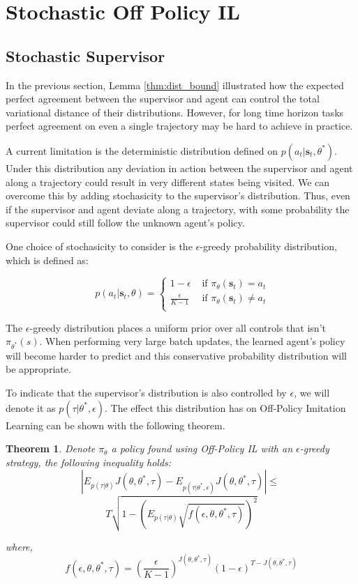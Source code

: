 \documentclass[conference]{article}
\newcommand{\bs}{\mathbf{s}}
\newtheorem{theorem}{Theorem}[section]
\begin{document}
\section{Stochastic Off Policy IL}\label{sec:stochastic_off}

\subsection{Stochastic Supervisor}
In the previous section, Lemma \ref{thm:dist_bound} illustrated how the expected perfect agreement between the supervisor and agent can control the total variational distance of their distributions.  However, for long time horizon tasks perfect agreement on even a single trajectory may be hard to achieve in practice. 

A current limitation is the deterministic distribution defined on $p(a_t|\bs_t,\theta^*)$.  Under this distribution any deviation in action between the supervisor and agent along a trajectory could result in very different states being visited. We can overcome this  by adding stochasicity to the supervisor's distribution. Thus, even if the supervisor and agent deviate along a trajectory, with some probability the supervisor could still follow the unknown agent's policy. 

One  choice of stochasicity to consider is the $\epsilon$-greedy probability distribution, which is defined as: 

\[
\ p(a_t|\bs_t,\theta) =
\left\{
\!
\begin{aligned}
1-\epsilon & \text{ if } \pi_{\theta}(\bs_t) = a_t\\
\frac{\epsilon}{K-1} & \text{ if } \pi_{\theta}(\bs_t) \neq a_t\\
\end{aligned}
\right.
\]

The $\epsilon$-greedy distribution places a uniform prior over all controls that isn't $\pi_{\theta^*}(s)$. When performing very large batch updates, the learned agent's policy will become harder to predict and this conservative probability distribution will be appropriate. 

 To indicate that the supervisor's distribution is also controlled by $\epsilon$, we will denote it as $p(\tau|\theta^*,\epsilon)$. The effect this distribution has on Off-Policy Imitation Learning can be shown with the following theorem.

\begin{theorem}\label{thm:sto_off_il}
Denote $\pi_{\theta}$ a policy found using Off-Policy IL with an $\epsilon$-greedy strategy, the following inequality holds:
$$ |E_{p(\tau|\theta)} J(\theta,\theta^*,\tau)  - E_{p(\tau|\theta^*,\epsilon)} J(\theta,\theta^*,\tau) | \leq \: $$
$$ T\sqrt{1 -\left( E_{p(\tau|\theta)}\sqrt{f(\epsilon,\theta,\theta^*,\tau)}\right)^2} $$

where, 
$$f(\epsilon,\theta,\theta^*,\tau) = (\frac{\epsilon}{K-1})^{J(\theta,\theta^*,\tau)}(1-\epsilon)^{T-J(\theta,\theta^*,\tau)}$$
\end{theorem}
\end{document}
